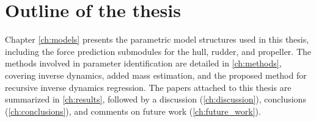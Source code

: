 %
\section{Outline of the thesis}
Chapter \ref{ch:models} presents the parametric model structures used in this thesis, including the force prediction submodules for the hull, rudder, and propeller. The methods involved in parameter identification are detailed in \autoref{ch:methods}, covering inverse dynamics, added mass estimation, and the proposed method for recursive inverse dynamics regression. The papers attached to this thesis are summarized in \autoref{ch:results}, followed by a discussion (\autoref{ch:discussion}), conclusions (\autoref{ch:conclusions}), and comments on future work (\autoref{ch:future_work}).